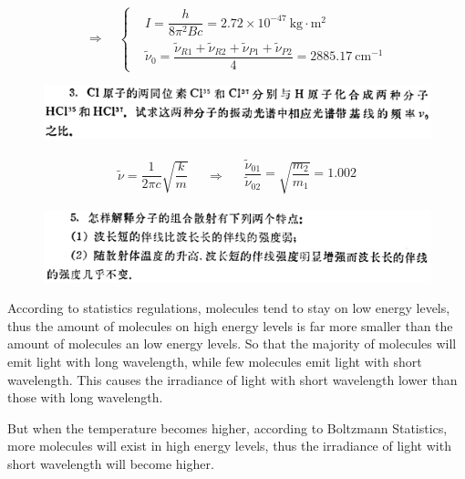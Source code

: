 \documentclass{article}
\newcommand{\si}[1]{\  \mathrm{#1}}
\begin{document}
\begin{equation*}
  \Rightarrow \quad
  \left\{
    \begin{aligned}
      & I = \dfrac{h}{8 \pi^2 B c} = 2.72 \times 10^{-47} \si{kg \cdot m^2} \\
      & \tilde{\nu}_0 = \dfrac{\tilde{\nu}_{R1} + \tilde{\nu}_{R2} +\tilde{\nu}_{P1} +\tilde{\nu}_{P2}}{4} = 2885.17 \si{cm^{-1}}
    \end{aligned}
  \right.
\end{equation*}

\begin{figure}[H]
  \centering
  \includegraphics[width=\linewidth]{figures/Problem3}
  \label{fig:}
\end{figure}

\begin{equation*}
  \begin{aligned}
    \tilde{\nu} = \dfrac{1}{2 \pi c} \sqrt{\dfrac{k}{m} } 
  \end{aligned}
  \quad \Rightarrow \quad 
  \begin{aligned}
    \dfrac{\tilde{\nu}_{01}}{\tilde{\nu}_{02}} = \sqrt{\dfrac{m_2}{m_1} } = 1.002
  \end{aligned}
\end{equation*}

\begin{figure}[H]
  \centering
  \includegraphics[width=\linewidth]{figures/Problem5}
  \label{fig:}
\end{figure}

According to statistics regulations, molecules tend to stay on low energy levels, thus the amount of molecules on high energy levels is far more smaller than the amount of molecules an low energy levels. So that the majority of molecules will emit light with long wavelength, while few molecules emit light with short wavelength. This causes the irradiance of light with short wavelength lower than those with long wavelength.

But when the temperature becomes higher, according to Boltzmann Statistics, more molecules will exist in high energy levels, thus the irradiance of light with short wavelength will become higher.
\end{document}
